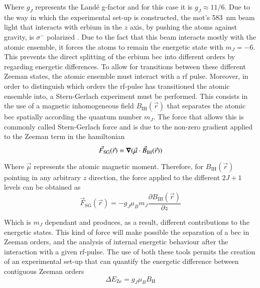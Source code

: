 Where $g_J$ represents the Landé g-factor and for this case it is $g_J\approx11/6$. Due to the way in which the experimental set-up is constructed, the \ac{mot}'s \SI{583}{\nano\meter} beam light that interacts with erbium in the $z$ axis, by pushing the atoms against gravity, is $\sigma^-$ polarized \cite{Ulitzsch2016}. Due to the fact that this beam interacts mostly with the atomic ensemble, it forces the atoms to remain the energetic state with $m_J = -6$. This prevents the direct splitting of the erbium \ac{bec} into different orders by regarding energetic differences. To allow for transitions between these different Zeeman states, the atomic ensemble must interact with a \acf{rf} pulse. Moreover, in order to distinguish which orders the \ac{rf}-pulse has transitioned the atomic ensemble into, a Stern-Gerlach experiment must be performed. This consists in the use of a magnetic inhomogeneous field $B_\text{IH}(\vec{r})$ that separates the atomic \ac{bec} spatially according the quantum number $m_J$. The force that allows this is commonly called Stern-Gerlach force and is due to the non-zero gradient applied to the Zeeman term in the hamiltonian \cite{Foot2005}
\begin{equation}
	\vec{F}_\text{SG}(\vec{r}) = \grad{(\vec{\mu}\cdot\vec{B}_\text{IH}(\vec{r}))}
\end{equation}

Where $\vec{\mu}$ represents the atomic magnetic moment. Therefore, for $B_\text{IH}(\vec{r})$ pointing in any arbitrary $z$ direction, the force applied to the different $2J+1$ levels can be obtained as
\begin{equation}\label{eq:Stern-Gerlach_force}
	\vec{F}_\text{SG}(\vec{r}) = - g_J \mu_B m_J \frac{\partial B_\text{IH}(\vec{r})}{\partial z}
\end{equation}

Which is $m_J$ dependant and produces, as a result, different contributions to the energetic states. This kind of force will make possible the separation of a \ac{bec} in Zeeman orders, and the analysis of internal energetic behaviour after the interaction with a given \ac{rf}-pulse. The use of both these tools permits the creation of an experimental set-up that can quantify the energetic difference between contiguous Zeeman orders
\begin{equation}\label{eq:Zeeman_splitting_difference}
\Delta E_\text{Ze} = g_J \mu_B B_\text{H}
\end{equation}

